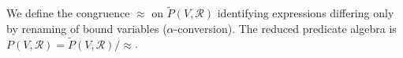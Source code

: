 We define the congruence $\approx$ on $\tilde{P}(V, \mathcal{R})$ identifying expressions differing only by renaming of bound variables ($\alpha$-conversion). The reduced predicate algebra is $P(V, \mathcal{R}) = \tilde{P}(V, \mathcal{R})/{\approx}$.
